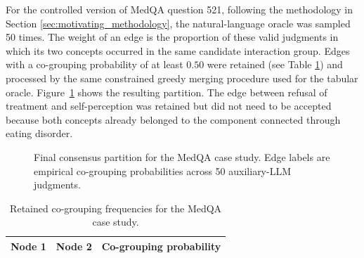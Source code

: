 For the controlled version of MedQA question 521, following the methodology in Section \ref{sec:motivating_methodology}, the natural-language oracle was
sampled 50 times. The weight of an edge is the proportion of these valid judgments
in which its two concepts occurred in the same candidate interaction group. Edges
with a co-grouping probability of at least $0.50$ were retained (see Table \ref{tab:rq5-cogrouping}) and processed by the
same constrained greedy merging procedure used for the tabular oracle. Figure~\ref{fig:rq5-oracle-grouping}
shows the resulting partition. The edge between refusal of treatment and
self-perception was retained but did not need to be accepted because both concepts
already belonged to the component connected through eating disorder.

\begin{figure}[H]
  \centering
  
  \caption{Final consensus partition for the MedQA case study. Edge labels are empirical co-grouping probabilities across 50 auxiliary-LLM judgments.}
  \label{fig:rq5-oracle-grouping}
\end{figure}

\begingroup
\small
\newcommand{\RQFiveNode}[5]{%
  \expandafter\def\csname RQFiveAppendixNodeLabel@#1\endcsname{#2}%
}
\newcommand{\RQFiveEdge}[4]{}

\renewcommand{\RQFiveNode}[5]{}
\renewcommand{\RQFiveEdge}[4]{%
  \csname RQFiveAppendixNodeLabel@#1\endcsname &
  \csname RQFiveAppendixNodeLabel@#2\endcsname & #3\tabularnewline
}
\begin{table}[H]
  \centering
  \caption{Retained co-grouping frequencies for the MedQA case study.}
  \label{tab:rq5-cogrouping}
  \begin{tabular}{@{}p{}p{}>{\raggedleft\arraybackslash}p{}@{}}
    \hline
    \textbf{Node 1} & \textbf{Node 2} & \textbf{Co-grouping probability}\\
    \hline
    
  \end{tabular}
\end{table}
\endgroup

